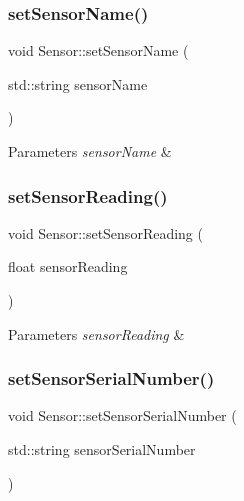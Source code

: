 \subsubsection{\texorpdfstring{set\+Sensor\+Name()}{setSensorName()}}
{\footnotesize\ttfamily void Sensor\+::set\+Sensor\+Name (\begin{DoxyParamCaption}\item[{std\+::string}]{sensor\+Name }\end{DoxyParamCaption})}






\begin{DoxyParams}{Parameters}
{\em sensor\+Name} & \\
\hline
\end{DoxyParams}
\mbox{\label{class_sensor_aa89b192e3203c85e62599c6239f01225}} 
\subsubsection{\texorpdfstring{set\+Sensor\+Reading()}{setSensorReading()}}
{\footnotesize\ttfamily void Sensor\+::set\+Sensor\+Reading (\begin{DoxyParamCaption}\item[{float}]{sensor\+Reading }\end{DoxyParamCaption})}






\begin{DoxyParams}{Parameters}
{\em sensor\+Reading} & \\
\hline
\end{DoxyParams}
\mbox{\label{class_sensor_a59ad3f638a81e29a9fac3526be948ce5}} 
\subsubsection{\texorpdfstring{set\+Sensor\+Serial\+Number()}{setSensorSerialNumber()}}
{\footnotesize\ttfamily void Sensor\+::set\+Sensor\+Serial\+Number (\begin{DoxyParamCaption}\item[{std\+::string}]{sensor\+Serial\+Number }\end{DoxyParamCaption})}






